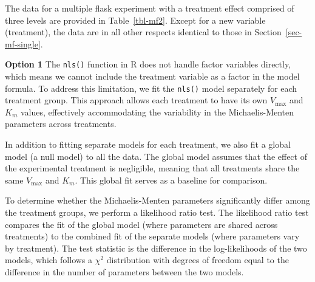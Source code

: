 \documentclass[
  letterpaper,
]{book}
\begin{document}
The data for a multiple flask experiment with a treatment effect
comprised of three levels are provided in Table~\ref{tbl-mf2}. Except
for a new variable (treatment), the data are in all other respects
identical to those in Section~\ref{sec-mf-single}.

\begin{table}

\caption{\label{tbl-mf2}Simulated data with three treatment levels for a
multiple flask experiment on a seaweed species.}


\end{table}%

\textbf{Option 1} The \texttt{nls()} function in R does not handle
factor variables directly, which means we cannot include the treatment
variable as a factor in the model formula. To address this limitation,
we fit the \texttt{nls()} model separately for each treatment group.
This approach allows each treatment to have its own \(V_{\max}\) and
\(K_m\) values, effectively accommodating the variability in the
Michaelis-Menten parameters across treatments.

In addition to fitting separate models for each treatment, we also fit a
global model (a null model) to all the data. The global model assumes
that the effect of the experimental treatment is negligible, meaning
that all treatments share the same \(V_{\max}\) and \(K_m\). This global
fit serves as a baseline for comparison.

To determine whether the Michaelis-Menten parameters significantly
differ among the treatment groups, we perform a likelihood ratio test.
The likelihood ratio test compares the fit of the global model (where
parameters are shared across treatments) to the combined fit of the
separate models (where parameters vary by treatment). The test statistic
is the difference in the log-likelihoods of the two models, which
follows a \(\chi^2\) distribution with degrees of freedom equal to the
difference in the number of parameters between the two models.
\end{document}
